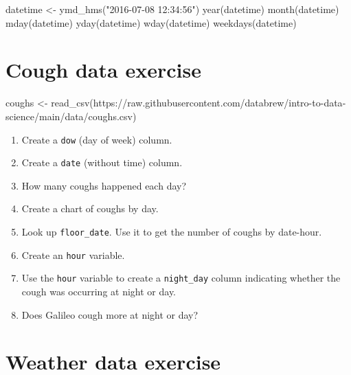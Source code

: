 \documentclass[
]{book}
\newenvironment{Shaded}{\begin{snugshade}}{\end{snugshade}}
\newcommand{\FunctionTok}[1]{\textcolor[rgb]{0.00,0.00,0.00}{#1}}
\newcommand{\NormalTok}[1]{#1}
\newcommand{\OtherTok}[1]{\textcolor[rgb]{0.56,0.35,0.01}{#1}}
\newcommand{\StringTok}[1]{\textcolor[rgb]{0.31,0.60,0.02}{#1}}
\begin{document}
\begin{Shaded}
\begin{Highlighting}[]
\NormalTok{datetime }\OtherTok{\textless{}{-}} \FunctionTok{ymd\_hms}\NormalTok{(}\StringTok{"2016{-}07{-}08 12:34:56"}\NormalTok{)}
\FunctionTok{year}\NormalTok{(datetime)}
\FunctionTok{month}\NormalTok{(datetime)}
\FunctionTok{mday}\NormalTok{(datetime)}
\FunctionTok{yday}\NormalTok{(datetime)}
\FunctionTok{wday}\NormalTok{(datetime)}
\FunctionTok{weekdays}\NormalTok{(datetime)}
\end{Highlighting}
\end{Shaded}

\hypertarget{cough-data-exercise}{%
\section*{Cough data exercise}\label{cough-data-exercise}}

\begin{Shaded}
\begin{Highlighting}[]
\NormalTok{coughs }\OtherTok{\textless{}{-}} \FunctionTok{read\_csv}\NormalTok{(}\StringTok{\textquotesingle{}https://raw.githubusercontent.com/databrew/intro{-}to{-}data{-}science/main/data/coughs.csv\textquotesingle{}}\NormalTok{)}
\end{Highlighting}
\end{Shaded}

\begin{enumerate}
\def\labelenumi{\arabic{enumi}.}
\item
  Create a \texttt{dow} (day of week) column.
\item
  Create a \texttt{date} (without time) column.
\item
  How many coughs happened each day?
\item
  Create a chart of coughs by day.
\item
  Look up \texttt{floor\_date}. Use it to get the number of coughs by date-hour.
\item
  Create an \texttt{hour} variable.
\item
  Use the \texttt{hour} variable to create a \texttt{night\_day} column indicating whether the cough was occurring at night or day.
\item
  Does Galileo cough more at night or day?
\end{enumerate}

\hypertarget{weather-data-exercise}{%
\section*{Weather data exercise}\label{weather-data-exercise}}
\end{document}
